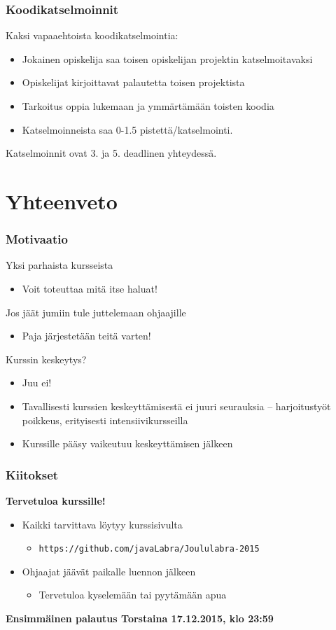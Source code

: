 \documentclass[finnish]{beamer}
\begin{document}
	\begin{frame}
		\frametitle{Koodikatselmoinnit}
		
		Kaksi vapaaehtoista koodikatselmointia:
		\begin{itemize}
			\item Jokainen opiskelija saa toisen opiskelijan projektin katselmoitavaksi
			\item Opiskelijat kirjoittavat palautetta toisen projektista
			\item Tarkoitus oppia lukemaan ja ymmärtämään toisten koodia
			\item Katselmoinneista saa 0-1.5 pistettä/katselmointi.
		\end{itemize}
		Katselmoinnit ovat 3. ja 5. deadlinen yhteydessä.
	\end{frame}
	
	\section{Yhteenveto}
	
	\begin{frame}
		\frametitle{Motivaatio}

		Yksi parhaista kursseista
		\begin{itemize}
			\item Voit toteuttaa mitä itse haluat!
		\end{itemize}		
		
		Jos jäät jumiin tule juttelemaan ohjaajille
		\begin{itemize}
			\item Paja järjestetään teitä varten!
		\end{itemize}
		
		Kurssin keskeytys?
		\begin{itemize}
			\item Juu ei!
			\item Tavallisesti kurssien keskeyttämisestä ei juuri seurauksia -- harjoitustyöt poikkeus, erityisesti intensiivikursseilla
			\item Kurssille pääsy vaikeutuu keskeyttämisen jälkeen
		\end{itemize}
	\end{frame}
	
	\begin{frame}
		\frametitle{Kiitokset}

		{\LARGE \textbf{Tervetuloa kurssille!}}
		\begin{itemize}
			\item Kaikki tarvittava löytyy kurssisivulta
			\begin{itemize}
				\item \texttt{https://github.com/javaLabra/Joululabra-2015}
			\end{itemize}
			\item Ohjaajat jäävät paikalle luennon jälkeen
			\begin{itemize}
				\item Tervetuloa kyselemään tai pyytämään apua 
			\end{itemize}
		\end{itemize}
		\textbf{Ensimmäinen palautus Torstaina 17.12.2015, klo 23:59}
		
	\end{frame}
	
\end{document}
